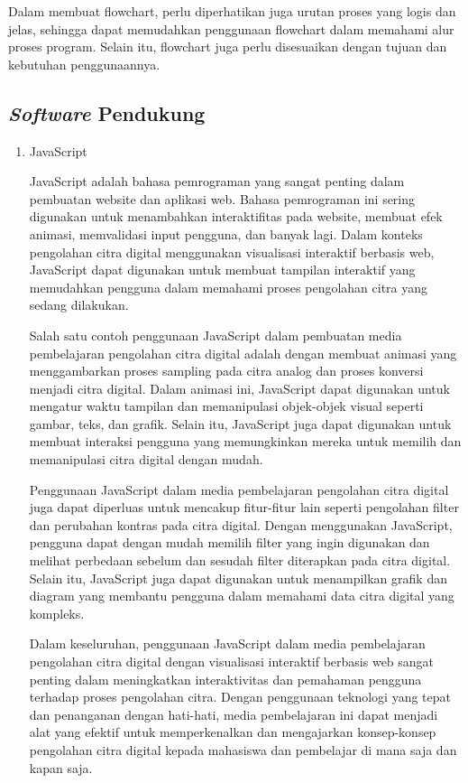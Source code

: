 \begin{enumerate}[leftmargin=1cm, itemindent=0.6cm,labelwidth=15pt, labelsep=5pt, listparindent=1cm,align=left]
	      Dalam membuat flowchart, perlu diperhatikan juga urutan proses yang logis dan jelas, sehingga dapat memudahkan penggunaan flowchart dalam memahami alur proses program. Selain itu, flowchart juga perlu disesuaikan dengan tujuan dan kebutuhan penggunaannya.

\end{enumerate}

\subsection{\textit{Software} Pendukung}
\begin{enumerate}[leftmargin=1cm, itemindent=0.6cm,labelwidth=15pt, labelsep=5pt, listparindent=1cm,align=left]

	\item JavaScript

	      JavaScript adalah bahasa pemrograman yang sangat penting dalam pembuatan website dan aplikasi web. Bahasa pemrograman ini sering digunakan untuk menambahkan interaktifitas pada website, membuat efek animasi, memvalidasi input pengguna, dan banyak lagi. Dalam konteks pengolahan citra digital menggunakan visualisasi interaktif berbasis web, JavaScript dapat digunakan untuk membuat tampilan interaktif yang memudahkan pengguna dalam memahami proses pengolahan citra yang sedang dilakukan.

	      Salah satu contoh penggunaan JavaScript dalam pembuatan media pembelajaran pengolahan citra digital adalah dengan membuat animasi yang menggambarkan proses sampling pada citra analog dan proses konversi menjadi citra digital. Dalam animasi ini, JavaScript dapat digunakan untuk mengatur waktu tampilan dan memanipulasi objek-objek visual seperti gambar, teks, dan grafik. Selain itu, JavaScript juga dapat digunakan untuk membuat interaksi pengguna yang memungkinkan mereka untuk memilih dan memanipulasi citra digital dengan mudah.

	      Penggunaan JavaScript dalam media pembelajaran pengolahan citra digital juga dapat diperluas untuk mencakup fitur-fitur lain seperti pengolahan filter dan perubahan kontras pada citra digital. Dengan menggunakan JavaScript, pengguna dapat dengan mudah memilih filter yang ingin digunakan dan melihat perbedaan sebelum dan sesudah filter diterapkan pada citra digital. Selain itu, JavaScript juga dapat digunakan untuk menampilkan grafik dan diagram yang membantu pengguna dalam memahami data citra digital yang kompleks.

	      Dalam keseluruhan, penggunaan JavaScript dalam media pembelajaran pengolahan citra digital dengan visualisasi interaktif berbasis web sangat penting dalam meningkatkan interaktivitas dan pemahaman pengguna terhadap proses pengolahan citra. Dengan penggunaan teknologi yang tepat dan penanganan dengan hati-hati, media pembelajaran ini dapat menjadi alat yang efektif untuk memperkenalkan dan mengajarkan konsep-konsep pengolahan citra digital kepada mahasiswa dan pembelajar di mana saja dan kapan saja.


\end{enumerate}
